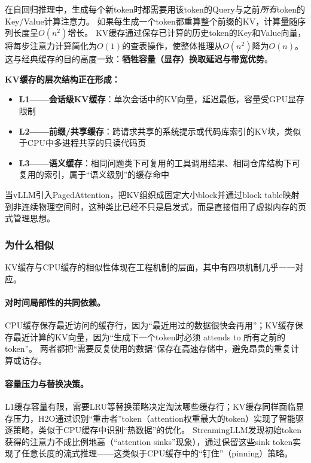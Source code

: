 在自回归推理中，生成每个新token时都需要用该token的Query与之前\textit{所有}token的Key/Value计算注意力。
如果每生成一个token都重算整个前缀的KV，计算量随序列长度呈$O(n^2)$增长。
KV缓存通过保存已计算的历史token的Key和Value向量，将每步注意力计算简化为$O(1)$的查表操作，使整体推理从$O(n^2)$降为$O(n)$。
这与经典缓存的目的高度一致：\textbf{牺牲容量（显存）换取延迟与带宽优势}\cite{drepper2007memory,kwon2023pagedattention}。

\textbf{KV缓存的层次结构正在形成：}
\begin{itemize}[nosep]
\item \textbf{L1——会话级KV缓存}：单次会话中的KV向量，延迟最低，容量受GPU显存限制
\item \textbf{L2——前缀/共享缓存}：跨请求共享的系统提示或代码库索引的KV块，类似于CPU中多进程共享的只读代码页\cite{vllm_prefix_2026,sglang_docs_2026,gim2024promptcache}
\item \textbf{L3——语义缓存}：相同问题类下可复用的工具调用结果、相同仓库结构下可复用的索引，属于``语义级别''的缓存命中
\end{itemize}

当vLLM引入PagedAttention，把KV组织成固定大小block并通过block table映射到非连续物理空间时，这种类比已经不只是启发式，而是直接借用了虚拟内存的页式管理思想\cite{kwon2023pagedattention}。

\subsubsection{为什么相似}

KV缓存与CPU缓存的相似性体现在工程机制的层面，其中有四项机制几乎一一对应。

\paragraph{对时间局部性的共同依赖。}
CPU缓存保存最近访问的缓存行，因为``最近用过的数据很快会再用''；KV缓存保存最近计算的KV向量，因为``生成下一个token时必须 attends to 所有之前的token''。
两者都把``需要反复使用的数据''保存在高速存储中，避免昂贵的重复计算或访存。

\paragraph{容量压力与替换决策。}
L1缓存容量有限，需要LRU等替换策略决定淘汰哪些缓存行；KV缓存同样面临显存压力，H2O通过识别``重击者''token（attention权重最大的token）实现了智能驱逐策略\cite{h2o2023}，类似于CPU缓存中识别``热数据''的优化。
StreamingLLM发现初始token获得的注意力不成比例地高（``attention sinks''现象），通过保留这些sink token实现了任意长度的流式推理\cite{xiao2024streamingllm}——这类似于CPU缓存中的``钉住''（pinning）策略。

